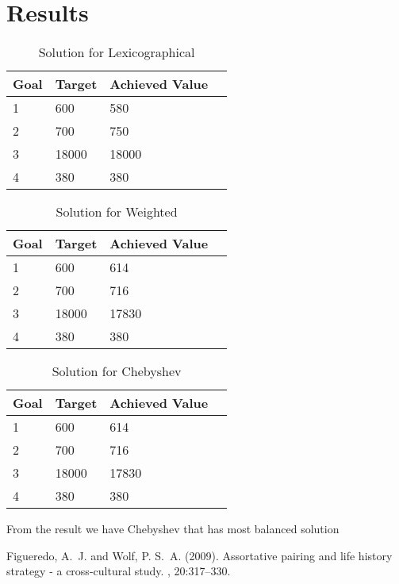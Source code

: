 \documentclass[twoside,twocolumn]{article}
\begin{document}

\section{Results}

\begin{table}[h]
\caption{Solution for Lexicographical}
\centering
\begin{tabular}{lllr}
Goal & Target & Achieved Value \\
\midrule
1    & 600    & 580            \\ 
2    & 700    & 750            \\ 
3    & 18000  & 18000          \\ 
4    & 380    & 380            \\ 
\bottomrule
\end{tabular}
\end{table}

\begin{table}[h]
\caption{Solution for Weighted}
\centering
\begin{tabular}{lllr}
Goal & Target & Achieved Value \\
\midrule
1    & 600    & 614 \\ 
2    & 700    & 716            \\ 
3    & 18000  & 17830 \\ 
4    & 380    & 380            \\ 
\bottomrule
\end{tabular}
\end{table}

\begin{table}[h]
\caption{Solution for Chebyshev}
\centering
\begin{tabular}{lllr}
Goal & Target & Achieved Value \\
\midrule
1    & 600    & 614            \\ 
2    & 700    & 716            \\ 
3    & 18000  & 17830 			\\ 
4    & 380    & 380            \\ 
\bottomrule
\end{tabular}
\end{table}

From the result we have Chebyshev that has most balanced solution

\begin{thebibliography}{99} %

Figueredo, A.~J. and Wolf, P. S.~A. (2009).
\newblock Assortative pairing and life history strategy - a cross-cultural
  study.
, 20:317--330.
 
\end{thebibliography}

\end{document}
